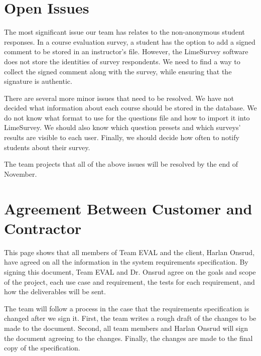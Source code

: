 \documentclass{article}
\begin{document}
\section{Open Issues}

The most significant issue our team has relates to the non-anonymous student responses. In a course evaluation survey, a student has the option to add a signed comment to be stored in an instructor's file. However, the LimeSurvey software does not store the identities of survey respondents. We need to find a way to collect the signed comment along with the survey, while ensuring that the signature is authentic.

There are several more minor issues that need to be resolved. We have not decided what information about each course should be stored in the database. We do not know what format to use for the questions file and how to import it into LimeSurvey. We should also know which question presets and which surveys' results are visible to each user. Finally, we should decide how often to notify students about their survey.

The team projects that all of the above issues will be resolved by the end of November.

\appendix

\newpage
\section{Agreement Between Customer and Contractor}
This page shows that all members of Team EVAL and the client, Harlan Onsrud, have agreed on all the information in the system requirements specification. By signing this document, Team EVAL and Dr. Onsrud agree on the goals and scope of the project, each use case and requirement, the tests for each requirement, and how the deliverables will be sent.

The team will follow a process in the case that the requirements specification is changed after we sign it. First, the team writes a rough draft of the changes to be made to the document. Second, all team members and Harlan Onsrud will sign the document agreeing to the changes. Finally, the changes are made to the final copy of the specification.
\end{document}
